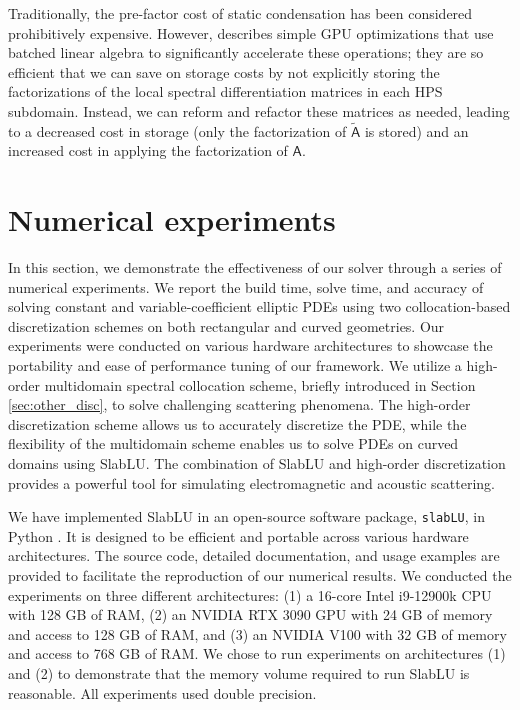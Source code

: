 \documentclass[11pt]{amsart}
\newcommand{\mtx}[1]{\bm{\mathsf{#1}}}
\begin{document}
Traditionally, the pre-factor cost of static condensation has been considered prohibitively expensive. 
However, \cite{yesypenko2022parallel} describes simple GPU optimizations that use batched linear algebra to significantly accelerate these operations; they are so efficient that we can save on storage costs by not explicitly storing
the factorizations of the local spectral differentiation matrices in each HPS subdomain. Instead, 
we can reform and refactor these matrices as needed, leading to a decreased cost in storage (only the factorization of $\mtx {\tilde A}$ is stored)
and an increased cost in applying the factorization of $\mtx A$. 

\section{Numerical experiments}
\label{sec:num}

In this section, we demonstrate the effectiveness of our solver through a series of numerical experiments.
We report the build time, solve time, and accuracy of solving constant and variable-coefficient elliptic PDEs using
two collocation-based discretization schemes on both rectangular and curved geometries. Our experiments were conducted
on various hardware architectures to showcase the portability and ease of performance tuning of our framework.
We utilize a high-order multidomain spectral collocation scheme, briefly introduced in Section \ref{sec:other_disc},
to solve challenging scattering phenomena. The high-order discretization scheme allows us to accurately discretize the PDE, 
while the flexibility of the multidomain scheme enables us to solve PDEs on curved domains using SlabLU. The combination of SlabLU
and high-order discretization provides a powerful tool for simulating electromagnetic and acoustic scattering. 

We have implemented SlabLU in an open-source software package, \texttt{slabLU}, in Python \cite{YesypenkoSlabLUATwoLevel2024}. It is designed to be efficient and portable across various hardware architectures. The source code, detailed documentation, and usage examples are provided to facilitate the reproduction of our numerical results.
We conducted the experiments on three different architectures: (1) a 16-core Intel i9-12900k CPU with 128 GB of RAM,
(2) an NVIDIA RTX 3090 GPU with 24 GB of memory and access to 128 GB of RAM, and (3) an NVIDIA V100 with 32 GB of memory
and access to 768 GB of RAM. We chose to run experiments on architectures (1) and (2) to demonstrate that the memory volume required
to run SlabLU is reasonable. All experiments used double precision.
\end{document}
